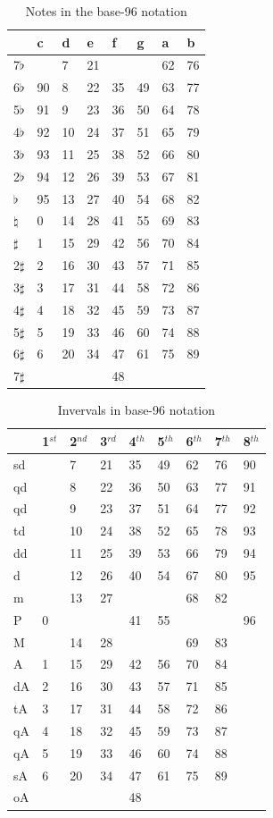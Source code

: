 \documentclass{article}
\begin{document}
\begin{table}
  \centering
  \begin{tabular}{l|lllllll}
               & c & d& e& f& g& a& b \\
    \hline
    7$\flat$   &   & 7&21&  &  &62&76 \\
    6$\flat$   & 90& 8&22&35&49&63&77 \\
    5$\flat$   & 91& 9&23&36&50&64&78 \\
    4$\flat$   & 92&10&24&37&51&65&79 \\
    3$\flat$   & 93&11&25&38&52&66&80 \\
    2$\flat$   & 94&12&26&39&53&67&81 \\
    $\flat$    & 95&13&27&40&54&68&82 \\
    $\natural$ &  0&14&28&41&55&69&83 \\
    $\sharp$   &  1&15&29&42&56&70&84 \\
    2$\sharp$  &  2&16&30&43&57&71&85 \\
    3$\sharp$  &  3&17&31&44&58&72&86 \\
    4$\sharp$  &  4&18&32&45&59&73&87 \\
    5$\sharp$  &  5&19&33&46&60&74&88 \\
    6$\sharp$  &  6&20&34&47&61&75&89 \\
    7$\sharp$  &   &  &  &48&  &  &   \\
  \end{tabular}
  \caption{Notes in the base-96 notation}
  \label{tab:jama-notas}
\end{table}

\begin{table}
  \centering
  \begin{tabular}{l|llllllll}
    & 1$^{st}$& 2$^{nd}$& 3$^{rd}$& 4$^{th}$& 5$^{th}$& 6$^{th}$& 7$^{th}$& 8$^{th}$ \\
    \hline
    sd  &  & 7&21&35&49&62&76&90 \\
    qd  &  & 8&22&36&50&63&77&91 \\
    qd  &  & 9&23&37&51&64&77&92 \\
    td  &  &10&24&38&52&65&78&93 \\
    dd  &  &11&25&39&53&66&79&94 \\
    d   &  &12&26&40&54&67&80&95 \\
    m   &  &13&27&  &  &68&82&   \\
    P   & 0&  &  &41&55&  &  &96 \\
    M   &  &14&28&  &  &69&83&   \\
    A   & 1&15&29&42&56&70&84&   \\
    dA  & 2&16&30&43&57&71&85&   \\
    tA  & 3&17&31&44&58&72&86&   \\
    qA  & 4&18&32&45&59&73&87&   \\
    qA  & 5&19&33&46&60&74&88&   \\
    sA  & 6&20&34&47&61&75&89&   \\
    oA  &  &  &  &48&  &  &  &   
  \end{tabular}
  \caption{Invervals in base-96 notation}
  \label{tab:jama-intervalos}
\end{table}
\end{document}
